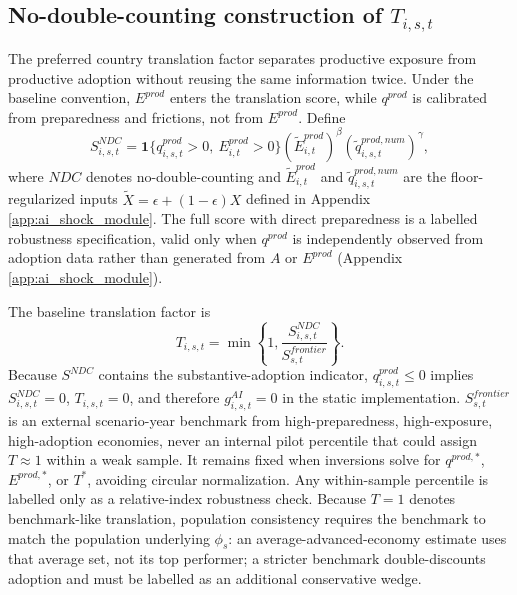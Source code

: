 \documentclass[11pt,a4paper]{article}
\begin{document}
\subsection[No-double-counting construction of T]{No-double-counting construction of $T_{i,s,t}$}\label{subsec:ndc_translation_main}

The preferred country translation factor separates productive exposure from productive adoption without reusing the same information twice. Under the baseline convention, $E^{prod}$ enters the translation score, while $q^{prod}$ is calibrated from preparedness and frictions, not from $E^{prod}$. Define
\begin{equation}\label{eq:S_ndc_main_v10}
    S^{NDC}_{i,s,t}=\mathbf{1}\{q^{prod}_{i,s,t}>0,\ E^{prod}_{i,t}>0\}(\tilde E^{prod}_{i,t})^{\beta}(\tilde q^{prod,num}_{i,s,t})^{\gamma},
\end{equation}
where $NDC$ denotes no-double-counting and $\tilde E^{prod}_{i,t}$ and $\tilde q^{prod,num}_{i,s,t}$ are the floor-regularized inputs $\tilde X=\epsilon+(1-\epsilon)X$ defined in Appendix \ref{app:ai_shock_module}. The full score with direct preparedness is a labelled robustness specification, valid only when $q^{prod}$ is independently observed from adoption data rather than generated from $A$ or $E^{prod}$ (Appendix \ref{app:ai_shock_module}).

The baseline translation factor is
\begin{equation}\label{eq:T_ndc_main_v10}
    T_{i,s,t}=\min\left\{1,\frac{S^{NDC}_{i,s,t}}{S^{frontier}_{s,t}}\right\}.
\end{equation}
Because $S^{NDC}$ contains the substantive-adoption indicator, $q^{prod}_{i,s,t}\leq0$ implies $S^{NDC}_{i,s,t}=0$, $T_{i,s,t}=0$, and therefore $g^{AI}_{i,s,t}=0$ in the static implementation.
$S^{frontier}_{s,t}$ is an external scenario-year benchmark from high-preparedness, high-exposure, high-adoption economies, never an internal pilot percentile that could assign $T\approx1$ within a weak sample. It remains fixed when inversions solve for $q^{prod,*}$, $E^{prod,*}$, or $T^*$, avoiding circular normalization. Any within-sample percentile is labelled only as a relative-index robustness check. Because $T=1$ denotes benchmark-like translation, population consistency requires the benchmark to match the population underlying $\phi_s$: an average-advanced-economy estimate uses that average set, not its top performer; a stricter benchmark double-discounts adoption and must be labelled as an additional conservative wedge.
\end{document}
